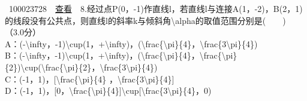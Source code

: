 ~{{100023728}~~\href{../question/viewQuestionDetail.jsp?questionID=100023728\&testPaperId=100229072}{查看}~~8.经过点P(0，-1)作直线l，若直线l与连接A(1，-2)，B(2，1)的线段没有公共点，则直线l的斜率k与倾斜角{\textbackslash{}alpha}的取值范围分别是(　　)\\
\hspace*{0.333em}\hspace*{0.333em}（3.0分）\\
\hspace*{0.333em}\hspace*{0.333em}\hspace*{0.333em}\hspace*{0.333em}\hspace*{0.333em}\hspace*{0.333em}\hspace*{0.333em}\hspace*{0.333em}A：(-{\textbackslash{}infty}，-1){\textbackslash{}cup}(1，+{\textbackslash{}infty})，({\textbackslash{}frac\{\textbackslash{}pi\}\{4\}}，{\textbackslash{}frac\{3\textbackslash{}pi\}\{4\}})\\[2\baselineskip]\hspace*{0.333em}\hspace*{0.333em}\hspace*{0.333em}\hspace*{0.333em}\hspace*{0.333em}\hspace*{0.333em}\hspace*{0.333em}\hspace*{0.333em}B：(-{\textbackslash{}infty}，-1){\textbackslash{}cup}(1，+{\textbackslash{}infty})，({\textbackslash{}frac\{\textbackslash{}pi\}\{4\}}，{\textbackslash{}frac\{\textbackslash{}pi\}\{2\}}){\textbackslash{}cup}({\textbackslash{}frac\{\textbackslash{}pi\}\{2\}}，{\textbackslash{}frac\{3\textbackslash{}pi\}\{4\}})\\[2\baselineskip]\hspace*{0.333em}\hspace*{0.333em}\hspace*{0.333em}\hspace*{0.333em}\hspace*{0.333em}\hspace*{0.333em}\hspace*{0.333em}\hspace*{0.333em}C：(-1，1)，{[}{\textbackslash{}frac\{\textbackslash{}pi\}\{4\}}
，{\textbackslash{}frac\{3\textbackslash{}pi\}\{4\}}{]}\\[2\baselineskip]\hspace*{0.333em}\hspace*{0.333em}\hspace*{0.333em}\hspace*{0.333em}\hspace*{0.333em}\hspace*{0.333em}\hspace*{0.333em}\hspace*{0.333em}D：(-1，1)，{[}0，{\textbackslash{}frac\{\textbackslash{}pi\}\{4\}}{]}{\textbackslash{}cup}{[}{\textbackslash{}frac\{3\textbackslash{}pi\}\{4\}}，0)\\[2\baselineskip]}

